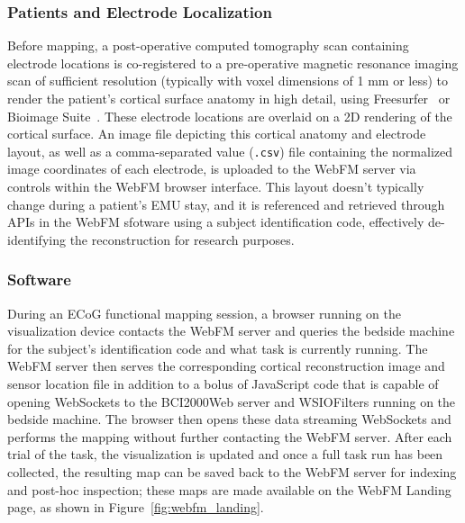 \documentclass[utf8]{frontiersSCNS}
\begin{document}
\subsubsection{Patients and Electrode Localization}

Before mapping, a post-operative computed tomography scan containing electrode locations is co-registered to a pre-operative magnetic resonance imaging scan of sufficient resolution (typically with voxel dimensions of 1 mm or less) to render the patient's cortical surface anatomy in high detail, using Freesurfer~\citep{fischl_freesurfer_2012} or Bioimage Suite~\citep{papademetris_bioimage_2006}.
These electrode locations are overlaid on a 2D rendering of the cortical surface.
An image file depicting this cortical anatomy and electrode layout, as well as a comma-separated value (\texttt{.csv}) file containing the normalized image coordinates of each electrode, is uploaded to the WebFM server via controls within the WebFM browser interface.
This layout doesn't typically change during a patient's EMU stay, and it is referenced and retrieved through APIs in the WebFM sfotware using a subject identification code, effectively de-identifying the reconstruction for research purposes.

\subsubsection{Software}

During an ECoG functional mapping session, a browser running on the visualization device contacts the WebFM server and queries the bedside machine for the subject's identification code and what task is currently running.
The WebFM server then serves the corresponding cortical reconstruction image and sensor location file in addition to a bolus of JavaScript code that is capable of opening WebSockets to the BCI2000Web server and WSIOFilters running on the bedside machine.
The browser then opens these data streaming WebSockets and performs the mapping without further contacting the WebFM server.
After each trial of the task, the visualization is updated and once a full task run has been collected, the resulting map can be saved back to the WebFM server for indexing and post-hoc inspection; these maps are made available on the WebFM Landing page, as shown in Figure~\ref{fig:webfm_landing}.
\end{document}
